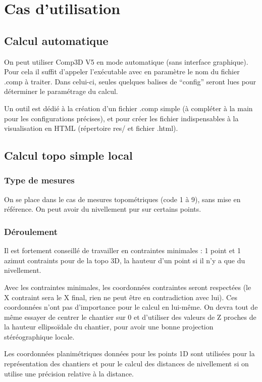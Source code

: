 \documentclass[french]{report}
\begin{document}
\chapter{Cas d'utilisation}


\section{Calcul automatique}
On peut utiliser Comp3D V5 en mode automatique (sans interface graphique).
Pour cela il suffit d'appeler l'exécutable avec en paramètre le nom du fichier .comp à traiter.
Dans celui-ci, seules quelques balises de ``config'' seront lues pour déterminer le paramétrage du calcul.

Un outil est dédié à la création d'un fichier .comp simple (à compléter à la main pour les configurations précises),
et pour créer les fichier indispensables à la visualisation en HTML (répertoire res/ et fichier .html).


\section{Calcul topo simple local}
\subsection{Type de mesures}
On se place dans le cas de mesures topométriques (code 1 à 9), sans mise en référence.
On peut avoir du nivellement pur sur certains points.

\subsection{Déroulement}
Il est fortement conseillé de travailler en contraintes minimales : 1 point et 1 azimut contraints pour de la topo 3D,
la hauteur d'un point si il n'y a que du nivellement.

Avec les contraintes minimales, les coordonnées contraintes seront respectées (le X contraint sera le X final, rien ne peut
être en contradiction avec lui). Ces coordonnées n'ont pas d'importance pour le calcul en lui-même.
On devra tout de même essayer de centrer le chantier sur 0 et d'utiliser des valeurs de Z proches de la hauteur ellipsoïdale du
chantier, pour avoir une bonne projection stéréographique locale.

Les coordonnées planimétriques données pour les points 1D sont utilisées pour la représentation des chantiers et pour le
calcul des distances de nivellement si on utilise une précision relative à la distance.
\end{document}

